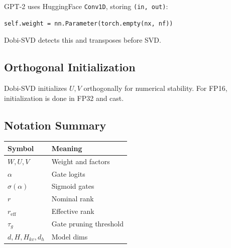 GPT-2 uses HuggingFace \texttt{Conv1D}, storing \texttt{(in, out)}:

\begin{lstlisting}
self.weight = nn.Parameter(torch.empty(nx, nf))
\end{lstlisting}

Dobi-SVD detects this and transposes before SVD.

\subsection{Orthogonal Initialization}

Dobi-SVD initializes $U, V$ orthogonally for numerical stability. For 
FP16, initialization is done in FP32 and cast.

\subsection{Notation Summary}

\begin{table}[H]
\centering
\small
\begin{tabular}{ll}
\toprule
\textbf{Symbol} & \textbf{Meaning} \\
\midrule
$W, U, V$ & Weight and factors \\
$\alpha$ & Gate logits \\
$\sigma(\alpha)$ & Sigmoid gates \\
$r$ & Nominal rank \\
$r_\text{eff}$ & Effective rank \\
$\tau_g$ & Gate pruning threshold \\
$d, H, H_{kv}, d_h$ & Model dims \\
\bottomrule
\end{tabular}
\end{table}

